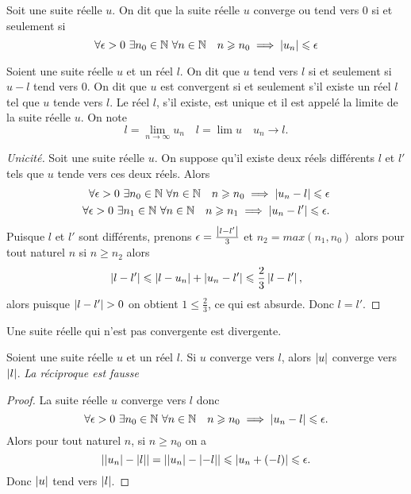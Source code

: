 \begin{defdef}
  Soit une suite réelle $u$. On dit que la suite réelle $u$ converge ou tend vers $0$ si et seulement si
  \begin{equation}
    \forall \epsilon >0 \ \exists n_0\in \N \ \forall n \in \N \quad n\geqslant n_0 \implies \abs{u_n}\leqslant \epsilon
  \end{equation}
\end{defdef}
\begin{defdef}
  Soient une suite réelle $u$ et un réel $l$. On dit que $u$ tend vers $l$ si et seulement si $u-l$ tend vers 0. On dit que $u$ est convergent si et seulement s'il existe un réel $l$ tel que $u$ tende vers $l$. Le réel $l$, s'il existe, est unique et il est appelé la limite de la suite réelle $u$. On note
  \begin{equation}
    l=\lim\limits_{n\to\infty} u_n \quad l=\lim u \quad u_n \rightarrow l.
  \end{equation}
\end{defdef}
\begin{proof}[Unicité]
  Soit une suite réelle $u$. On suppose qu'il existe deux réels différents $l$ et $l'$ tels que $u$ tende vers ces deux réels. Alors
  \begin{align}
    \forall \epsilon >0 \ \exists n_0\in \mathbb{N} \ \forall n\in\mathbb{N} \quad n\geqslant n_0 \implies \left\lvert u_n-l\right\rvert\leqslant \epsilon \\ 
    \forall \epsilon >0 \ \exists n_1\in \mathbb{N} \ \forall n\in\mathbb{N} \quad n\geqslant n_1 \implies \left\lvert u_n-l'\right\rvert\leqslant \epsilon.
  \end{align}
  Puisque $l$ et $l'$ sont différents, prenons $\epsilon=\frac{\left\lvert l-l'\right\rvert}{3}$ et $n_2=max(n_1,n_0)$ alors pour tout naturel $n$ si $n\geqslant n_2$ alors
\begin{equation}
  \left\lvert l-l'\right\rvert\leqslant \left\lvert l-u_n\right\rvert+\left\lvert u_n-l'\right\rvert\leqslant \frac{2}{3} \left\lvert l-l'\right\rvert,
\end{equation}
alors puisque $\left\lvert l-l'\right\rvert>0$ on obtient $1\leqslant \frac{2}{3}$, ce qui est absurde. Donc $l=l'$.
\end{proof}
\begin{defdef}
  Une suite réelle qui n'est pas convergente est divergente.
\end{defdef}
\begin{prop}
  Soient une suite réelle $u$ et un réel $l$. Si $u$ converge vers $l$, alors $\left\lvert u\right\rvert$ converge vers $\left\lvert l\right\rvert$. \emph{La réciproque est fausse}
\end{prop}
\begin{proof}
  La suite réelle $u$ converge vers $l$ donc
  \begin{equation}
    \forall \epsilon>0 \ \exists n_0 \in \mathbb{N} \ \forall n \in \mathbb{N} \quad n\geqslant n_0 \implies \left\lvert u_n-l\right\rvert\leqslant \epsilon.
  \end{equation}
  Alors pour tout naturel $n$, si $n\geqslant n_0$ on a
  \begin{equation}
    \left\lvert\left\lvert u_n\right\rvert-\left\lvert l\right\rvert\right\rvert=\left\lvert\left\lvert u_n\right\rvert-\left\lvert-l\right\rvert\right\rvert\leqslant \left\lvert u_n+(-l)\right\rvert\leqslant \epsilon.
  \end{equation}
  Donc $\left\lvert u\right\rvert$ tend vers $\left\lvert l\right\rvert$.
\end{proof}
